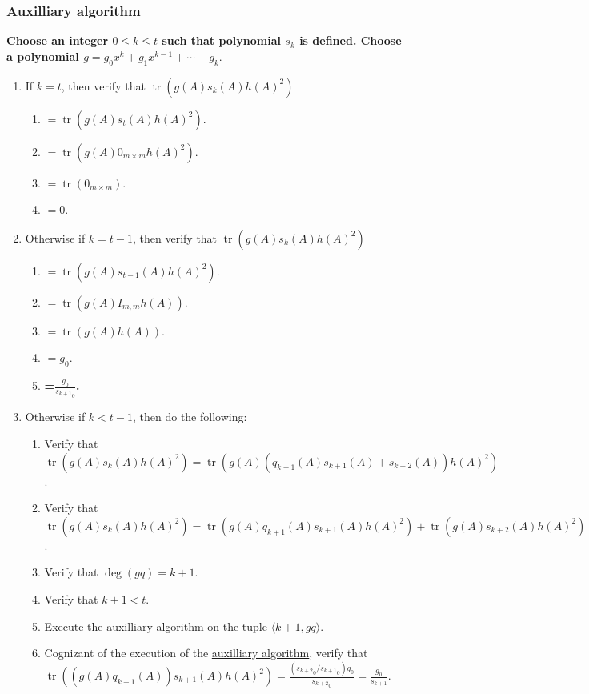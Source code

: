 \documentclass[twocolumn]{article}
\DeclareMathOperator{\tr}{tr}
\begin{document}
			\subsubsection{Auxilliary algorithm}\label{sec:algorithm 47 auxilliary algorithm}
				\textbf{Choose an integer $0\le k\le t$ such that polynomial $s_k$ is defined. Choose a polynomial $g=g_0x^k+g_1x^{k-1}+\cdots+g_k.$}
				\begin{enumerate}
					\item If $k=t$, then verify that $\tr(g(A)s_k(A)h(A)^2)$
					\begin{enumerate}
						\item $=\tr(g(A)s_t(A)h(A)^2)$.
						\item $=\tr(g(A)0_{m\times m}h(A)^2)$.
						\item $=\tr(0_{m\times m})$.
						\item $=0$.
					\end{enumerate}
					\item Otherwise if $k=t-1$, then verify that $\tr(g(A)s_k(A)h(A)^2)$
					\begin{enumerate}
						\item $=\tr(g(A)s_{t-1}(A)h(A)^2)$.
						\item $=\tr(g(A)I_{m,m}h(A))$.
						\item $=\tr(g(A)h(A))$.
						\item $=g_0$.
						\item \textbf{=$\frac{g_0}{{s_{k+1}}_0}$.}
					\end{enumerate}
					\item Otherwise if $k<t-1$, then do the following:
					\begin{enumerate}
						\item Verify that $\tr(g(A)s_k(A)h(A)^2)=\tr(g(A)(q_{k+1}(A)s_{k+1}(A)+s_{k+2}(A))h(A)^2)$.
						\item Verify that $\tr(g(A)s_k(A)h(A)^2)=\tr(g(A)q_{k+1}(A)s_{k+1}(A)h(A)^2)+\tr(g(A)s_{k+2}(A)h(A)^2)$.
						\item Verify that $\deg(gq)=k+1$.
						\item Verify that $k+1<t$.
						\item Execute the \hyperref[sec:algorithm 47 auxilliary algorithm]{auxilliary algorithm} on the tuple $\langle k+1, gq\rangle$.
						\item Cognizant of the execution of the \hyperref[sec:algorithm 47 auxilliary algorithm]{auxilliary algorithm}, verify that $\tr((g(A)q_{k+1}(A))s_{k+1}(A)h(A)^2)=\frac{({s_{k+2}}_0/{s_{k+1}}_0)g_0}{{s_{k+2}}_0}=\frac{g_0}{s_{k+1}}$.

\end{enumerate}
\end{enumerate}
\end{document}

